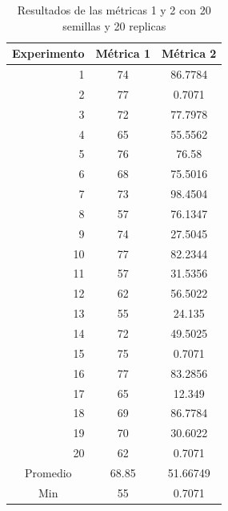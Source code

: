 \documentclass{article}
\begin{document}
\begin{center}
\begin{table}[htbp]
	\centering
	\caption{Resultados  de las métricas 1 y 2 con 20 semillas  y 20 replicas}
	\begin{tabular}{|c|c|c|}
		\hline
		Experimento  & \multicolumn{1}{l|}{Métrica 1} & \multicolumn{1}{p{6.835em}|}{Métrica 2} \\
		\hline
		\multicolumn{1}{|r|}{1} & 74    & 86.7784 \\
		\hline
		\multicolumn{1}{|r|}{2} & 77    & \cellcolor[rgb]{ .663,  .816,  .557}0.7071 \\
		\hline
		\multicolumn{1}{|r|}{3} & 72    & 77.7978 \\
		\hline
		\multicolumn{1}{|r|}{4} & 65    & 55.5562 \\
		\hline
		\multicolumn{1}{|r|}{5} & 76    & 76.58 \\
		\hline
		\multicolumn{1}{|r|}{6} & 68    & 75.5016 \\
		\hline
		\multicolumn{1}{|r|}{7} & 73    & 98.4504 \\
		\hline
		\multicolumn{1}{|r|}{8} & 57    & 76.1347 \\
		\hline
		\multicolumn{1}{|r|}{9} & 74    & 27.5045 \\
		\hline
		\multicolumn{1}{|r|}{10} & 77    & 82.2344 \\
		\hline
		\multicolumn{1}{|r|}{11} & 57    & 31.5356 \\
		\hline
		\multicolumn{1}{|r|}{12} & 62    & 56.5022 \\
		\hline
		\multicolumn{1}{|r|}{13} & \cellcolor[rgb]{ .663,  .816,  .557}55 & 24.135 \\
		\hline
		\multicolumn{1}{|r|}{14} & 72    & 49.5025 \\
		\hline
		\multicolumn{1}{|r|}{15} & 75    & \cellcolor[rgb]{ .663,  .816,  .557}0.7071 \\
		\hline
		\multicolumn{1}{|r|}{16} & 77    & 83.2856 \\
		\hline
		\multicolumn{1}{|r|}{17} & 65    & 12.349 \\
		\hline
		\multicolumn{1}{|r|}{18} & 69    & 86.7784 \\
		\hline
		\multicolumn{1}{|r|}{19} & 70    & 30.6022 \\
		\hline
		\multicolumn{1}{|r|}{20} & 62    & \cellcolor[rgb]{ .663,  .816,  .557}0.7071 \\
		\hline
		Promedio & 68.85 & 51.66749 \\
		\hline
		Min   & 55    & 0.7071 \\
		\hline
	\end{tabular}%
	\label{tab:cuadro 4}%
\end{table}%


\end{center}
\end{document}
